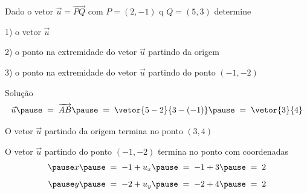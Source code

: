 \begin{question}
  Dado o vetor $\vec{u} = \overrightarrow{PQ}$ com
  \(
    P = ( 2, -1 )
  \)
  q
  \(
    Q = ( 5, 3 )
  \)
  determine

  1) o vetor $\vec{u}$

  2) o ponto na extremidade do vetor $\vec{u}$ partindo da origem

  3) o ponto na extremidade do vetor $\vec{u}$ partindo do ponto $( -1, -2)$
\end{question}

\begin{resolution}{Solução}
  \[
    \vec{u}
    \pause
    \;=\; \overrightarrow{AB}
    \pause
    \;=\; \vetor{5 - 2}{3 - (-1)}
    \pause
    \;=\; \vetor{3}{4}
  \]

  \pause
  O vetor $\vec{u}$ partindo da origem termina no ponto $(3, 4)$

  \pause
  O vetor $\vec{u}$ partindo do ponto $(-1, -2)$ termina no ponto com coordenadas
  \[
    \pause
    x
    \pause
    \;=\; -1 + u_x
    \pause
    \;=\; -1 + 3
    \pause
    \;=\; 2
  \]
  \[
    \pause
    y
    \pause
    \;=\; -2 + u_y
    \pause
    \;=\; -2 + 4
    \pause
    \;=\; 2
  \]
\end{resolution}

\endinput

